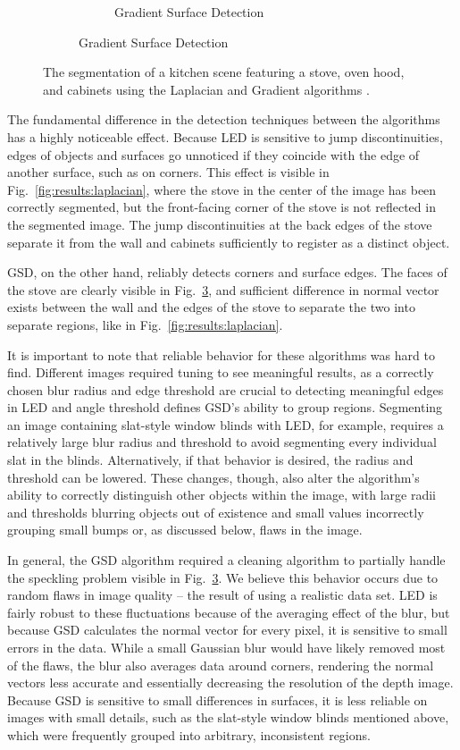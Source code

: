 \begin{figure}[t]
\begin{subfigure}{\textwidth}
\begin{subfigure}[t]{0.33\textwidth}
        \caption{Gradient Surface Detection}
        \label{fig:results:gradient}
    \end{subfigure}
\end{subfigure}
\caption{The segmentation of a kitchen scene featuring a stove, oven hood, and cabinets using the Laplacian and Gradient algorithms \cite{kinect}.}
\end{figure}

The fundamental difference in the detection techniques between the algorithms has a highly noticeable effect.  Because LED is sensitive to jump discontinuities, edges of objects and surfaces go unnoticed if they coincide with the edge of another surface, such as on corners.  This effect is visible in  Fig.~\ref{fig:results:laplacian}, where the stove in the center of the image has been correctly segmented, but the front-facing corner of the stove is not reflected in the segmented image.  The jump discontinuities at the back edges of the stove separate it from the wall and cabinets sufficiently to register as a distinct object.

GSD, on the other hand, reliably detects corners and surface edges.  The faces of the stove are clearly visible in Fig.~\ref{fig:results:gradient}, and sufficient difference in normal vector exists between the wall and the edges of the stove to separate the two into separate regions, like in Fig.~\ref{fig:results:laplacian}.  

It is important to note that reliable behavior for these algorithms was hard to find.  Different images required tuning to see meaningful results, as a correctly chosen blur radius and edge threshold are crucial to detecting meaningful edges in LED and angle threshold defines GSD's ability to group regions.  Segmenting an image containing slat-style window blinds with LED, for example, requires a relatively large blur radius and threshold to avoid segmenting every individual slat in the blinds.  Alternatively, if that behavior is desired, the radius and threshold can be lowered.  These changes, though, also alter the algorithm's ability to correctly distinguish other objects within the image, with large radii and thresholds blurring objects out of existence and small values incorrectly grouping small bumps or, as discussed below, flaws in the image.

In general, the GSD algorithm required a cleaning algorithm to partially handle the speckling problem visible in Fig.~\ref{fig:results:gradient}.  We believe this behavior occurs due to random flaws in image quality -- the result of using a realistic data set.  LED is fairly robust to these fluctuations because of the averaging effect of the blur, but because GSD calculates the normal vector for every pixel, it is sensitive to small errors in the data.  While a small Gaussian blur would have likely removed most of the flaws, the blur also averages data around corners, rendering the normal vectors less accurate and essentially decreasing the resolution of the depth image.  Because GSD is sensitive to small differences in surfaces, it is less reliable on images with small details, such as the slat-style window blinds mentioned above, which were frequently grouped into arbitrary, inconsistent regions.
